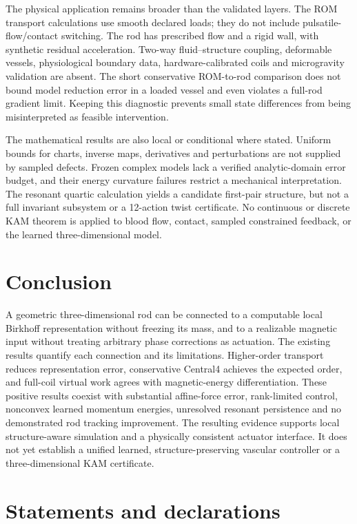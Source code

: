 The physical application remains broader than the validated layers. The ROM transport calculations use smooth declared loads; they do not include pulsatile-flow/contact switching. The rod has prescribed flow and a rigid wall, with synthetic residual acceleration. Two-way fluid--structure coupling, deformable vessels, physiological boundary data, hardware-calibrated coils and microgravity validation are absent. The short conservative ROM-to-rod comparison does not bound model reduction error in a loaded vessel and even violates a full-rod gradient limit. Keeping this diagnostic prevents small state differences from being misinterpreted as feasible intervention.

The mathematical results are also local or conditional where stated. Uniform bounds for charts, inverse maps, derivatives and perturbations are not supplied by sampled defects. Frozen complex models lack a verified analytic-domain error budget, and their energy curvature failures restrict a mechanical interpretation. The resonant quartic calculation yields a candidate first-pair structure, but not a full invariant subsystem or a 12-action twist certificate. No continuous or discrete KAM theorem is applied to blood flow, contact, sampled constrained feedback, or the learned three-dimensional model.

\section{Conclusion}
A geometric three-dimensional rod can be connected to a computable local Birkhoff representation without freezing its mass, and to a realizable magnetic input without treating arbitrary phase corrections as actuation. The existing results quantify each connection and its limitations. Higher-order transport reduces representation error, conservative Central4 achieves the expected order, and full-coil virtual work agrees with magnetic-energy differentiation. These positive results coexist with substantial affine-force error, rank-limited control, nonconvex learned momentum energies, unresolved resonant persistence and no demonstrated rod tracking improvement. The resulting evidence supports local structure-aware simulation and a physically consistent actuator interface. It does not yet establish a unified learned, structure-preserving vascular controller or a three-dimensional KAM certificate.

\section*{Statements and declarations}
